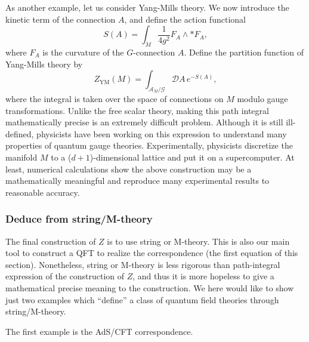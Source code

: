 As another example, let us consider Yang-Mills theory. We now introduce
the kinetic term of the connection $A$, and define the action functional
\begin{equation}
  S\left(A\right)  =  \int_{M}\frac{1}{4g^{2}}F_{A}\wedge*F_{A},
\end{equation}
where $F_{A}$ is the curvature of the $G$-connection $A$. Define
the partition function of Yang-Mills theory by 
\begin{equation}
  Z_{\mathrm{YM}}\left(M\right)  =  \int_{\mathcal{A}_{M}/\mathcal{G}}\mathcal{D}A\,e^{-S\left(A\right)},
\end{equation}
where the integral is taken over the space of connections on $M$
modulo gauge transformations. Unlike the free scalar theory, making
this path integral mathematically precise is an extremely difficult
problem. Although it is still ill-defined, physicists have been working
on this expression to understand many properties of quantum gauge
theories. Experimentally, physicists discretize the manifold $M$
to a ($d+1$)-dimensional lattice and put it on a supercomputer. At
least, numerical calculations show the above construction may be a
mathematically meaningful and reproduce many experimental results
to reasonable accuracy. 

\subsubsection*{Deduce from string/M-theory}

The final construction of $Z$ is to use string or M-theory. This
is also our main tool to construct a QFT to realize the correspondence
(the first equation of this section). Nonetheless, string or M-theory
is less rigorous than path-integral expression of the construction
of $Z$, and thus it is more hopeless to give a mathematical precise
meaning to the construction. We here would like to show just two examples
which ``define'' a class of quantum field theories through string/M-theory. 

The first example is the AdS/CFT correspondence. 

